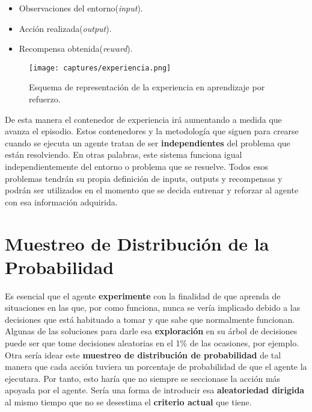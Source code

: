 \documentclass[11pt,fleqn]{book} %
\begin{document}
\begin{itemize}
	\item Observaciones del entorno(\textit{input}). \\
	
	\item Acción realizada(\textit{output}). \\
	
	\item Recompensa obtenida(\textit{reward}). \\
\end{itemize}

\begin{figure}[H]
	\centering\texttt{[image: captures/experiencia.png]}
	\caption{Esquema de representación de la experiencia en aprendizaje por refuerzo.}
	\label{fig:experiencia} %
\end{figure}

De esta manera el contenedor de experiencia irá aumentando a medida que avanza el episodio. Estos contenedores y la metodología que siguen para crearse cuando se ejecuta un agente tratan de ser \textbf{independientes} del problema que están resolviendo. En otras palabras, este sistema funciona igual independientemente del entorno o problema que se resuelve. Todos esos problemas tendrán su propia definición de inputs, outputs y recompensas y podrán ser utilizados en el momento que se decida entrenar y reforzar al agente con esa información adquirida. 

\section{Muestreo de Distribución de la Probabilidad}\label{sec:probabilidades}

Es esencial que el agente \textbf{experimente} con la finalidad de que aprenda de situaciones en las que, por como funciona, nunca se vería implicado debido a las decisiones que está habituado a tomar y que sabe que normalmente funcionan. \\

Algunas de las soluciones para darle esa \textbf{exploración} en su árbol de decisiones puede ser que tome decisiones aleatorias en el 1\% de las ocasiones, por ejemplo. Otra sería idear este \textbf{muestreo de distribución de probabilidad} de tal manera que cada acción tuviera un porcentaje de probabilidad de que el agente la ejecutara. Por tanto, esto haría que no siempre se seccionase la acción más apoyada por el agente. Sería una forma de introducir esa \textbf{aleatoriedad dirigida} al mismo tiempo que no se desestima el \textbf{criterio actual} que tiene. \\
\end{document}
